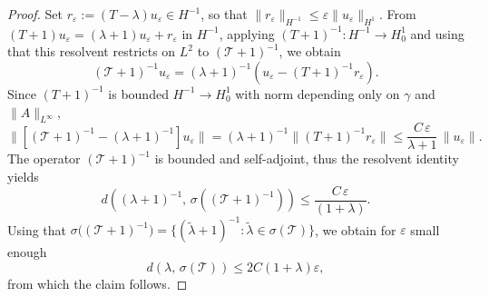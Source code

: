 \documentclass[a4paper,reqno]{amsart}
\numberwithin{equation}{section}
\numberwithin{equation}{section}		%
\numberwithin{figure}{section}			%
\numberwithin{table}{section}				%
\theoremstyle{definition}
\renewcommand{\tilde}{\widetilde}
\newcommand{\<}{\ensuremath \leq}
\renewcommand{\>}{\ensuremath \geq}
\renewcommand{\epsilon}{\varepsilon}
\renewcommand{\tilde}{\widetilde}
\begin{document}
\begin{proof}
Set $r_\epsilon:=(T-\lambda)u_\epsilon\in H^{-1}$, so that
$\lVert r_\epsilon\rVert_{H^{-1}}\leq\epsilon\lVert u_\epsilon\rVert_{H^1}$.
From $(T+1)u_\epsilon=(\lambda+1)u_\epsilon+r_\epsilon$ in $H^{-1}$, applying
$(T+1)^{-1}\colon H^{-1}\to H^1_0$ and using that this resolvent restricts on
$L^2$ to $(\mathcal T+1)^{-1}$, we obtain
\begin{equation}
  (\mathcal T+1)^{-1}u_\epsilon
  =(\lambda+1)^{-1}(u_\epsilon-(T+1)^{-1}r_\epsilon).
\end{equation}
Since $(T+1)^{-1}$ is bounded $H^{-1}\to H^1_0$ with norm depending only on
$\gamma$ and $\lVert A\rVert_{L^\infty}$,
\begin{equation}
  \lVert[(\mathcal T+1)^{-1}-(\lambda+1)^{-1}]u_\epsilon
  \rVert
  =(\lambda+1)^{-1}\lVert (T+1)^{-1}r_\epsilon\big\rVert
  \le\frac{C\,\epsilon}{\lambda+1}\,\lVert u_\epsilon\rVert.
\end{equation}
The operator $(\mathcal T+1)^{-1}$ is bounded and self-adjoint, thus the resolvent identity yields
\begin{equation}
  d((\lambda+1)^{-1},\,\sigma((\mathcal T+1)^{-1}))
  \le \frac{C\,\epsilon}{(1+\lambda)}.
\end{equation}
Using that
$\sigma\big((\mathcal T+1)^{-1}\big)
=\{(\tilde\lambda+1)^{-1}:\tilde\lambda\in\sigma(\mathcal T)\}$, we obtain for $\epsilon$ small enough
\begin{equation}
  d(\lambda,\,\sigma(\mathcal T))
  \leq 2C(1+\lambda)\epsilon,
\end{equation}
from which the claim follows.
\end{proof}
\end{document}
